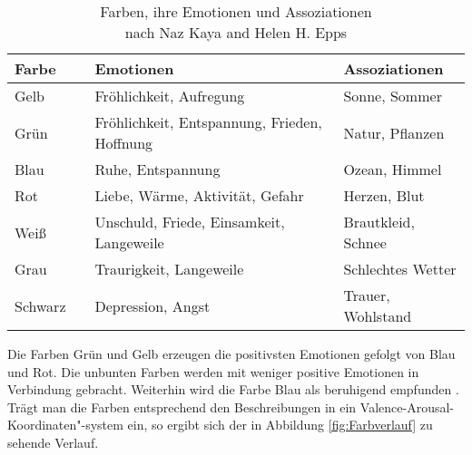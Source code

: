 \documentclass[11pt,a4paper]{article}
\begin{document}
\begin{center}
\begin{table}[!ht]
\begin{tabular}{l | l | l | l}
\textbf{Farbe} & & \textbf{Emotionen} & \textbf{Assoziationen}\\
\hline
Gelb & \cellcolor{yellow_color} & Fröhlichkeit, Aufregung & Sonne, Sommer \\
Grün & \cellcolor{green_color} & Fröhlichkeit, Entspannung, Frieden, Hoffnung & Natur, Pflanzen \\
Blau & \cellcolor{blue_color} & Ruhe, Entspannung & Ozean, Himmel \\
Rot & \cellcolor{red_color} & Liebe, Wärme, Aktivität, Gefahr & Herzen, Blut \\
Weiß & \cellcolor{white_color} & Unschuld, Friede, Einsamkeit, Langeweile & Brautkleid, Schnee \\
Grau & \cellcolor{gray_color} & Traurigkeit, Langeweile & Schlechtes Wetter \\
Schwarz & \cellcolor{black_color} & Depression, Angst & Trauer, Wohlstand \\

\end{tabular}
\captionsetup{justification=centering}
\caption[Farben Emotionen Assoziationen]{Farben, ihre Emotionen und Assoziationen\\nach Naz Kaya and Helen H. Epps
 \cite{c0f471f7e6a618d880cf25175c9f99ac97ef8ba7d016c7f8c523f8d902892d9e}}
\label{tab:ColorEmotions}

\end{table}
\end{center}
\noindent
Die Farben Grün und Gelb erzeugen die positivsten Emotionen gefolgt von Blau und Rot. Die unbunten Farben werden mit weniger positive Emotionen in Verbindung gebracht. Weiterhin wird die Farbe Blau als beruhigend empfunden \cite{c0f471f7e6a618d880cf25175c9f99ac97ef8ba7d016c7f8c523f8d902892d9e}.
\newpage
\noindent
Trägt man die Farben entsprechend den Beschreibungen in ein Valence-Arousal-Koordinaten"-system ein, so ergibt sich der in Abbildung \ref{fig:Farbverlauf} zu sehende Verlauf.
\end{document}
